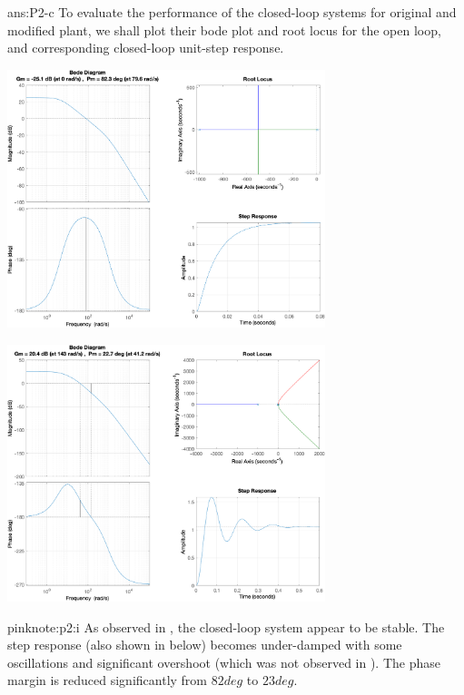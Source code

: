 \documentclass{tron}
\begin{document}
\newpage
\begin{answer}{ans:P2-c}
	To evaluate the performance of the closed-loop systems for original and modified plant, we shall plot their bode plot and root locus for the open loop, and corresponding closed-loop unit-step response.
	
	{	
		\centering\includegraphics[width=350px]{../matlab/output/q1/siso_plot_L1}
	}
		
	{	
		\centering\includegraphics[width=350px]{../matlab/output/q2/siso_plot_p2ci-L1-modified}
	}
	
	\begin{note}{pink}{note:p2:i}
		As observed in , the closed-loop system appear to be stable. The step response (also shown in  below) becomes under-damped with some oscillations and significant overshoot (which was not observed in ). The phase margin is reduced significantly from $82 \unit{deg}$ to $23 \unit{deg}$. 
		

\end{note}
\end{answer}
\end{document}
